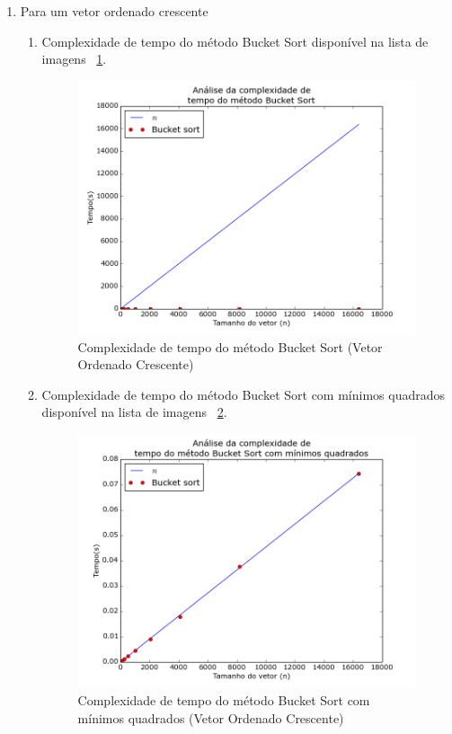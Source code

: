 \documentclass[12pt,a4paper,twoside]{report}
\begin{document}
\begin{enumerate}
\begin{enumerate}
	\end{enumerate}

	\item Para um vetor ordenado crescente
		\begin{enumerate}

			\item Complexidade de tempo do método Bucket Sort disponível na lista de imagens ~\ref{fig:BucketPlot2OC}.
			\begin{figure}[!h]
				\centering
				\includegraphics[scale=0.6]{../imagens/Bucket/Bucket_plot_2_ordenado_crescente.png}
				\caption{Complexidade de tempo do método Bucket Sort (Vetor Ordenado Crescente) \label{fig:BucketPlot2OC}}
			\end{figure}


			\item Complexidade de tempo do método Bucket Sort com mínimos quadrados disponível na lista de imagens ~\ref{fig:BucketPlot3OC}.
			\begin{figure}[!h]
				\centering
				\includegraphics[scale=0.6]{../imagens/Bucket/Bucket_plot_3_ordenado_crescente.png}
				\caption{Complexidade de tempo do método Bucket Sort com mínimos quadrados (Vetor Ordenado Crescente) \label{fig:BucketPlot3OC}}
			\end{figure}


\end{enumerate}
\end{enumerate}
\end{document}
